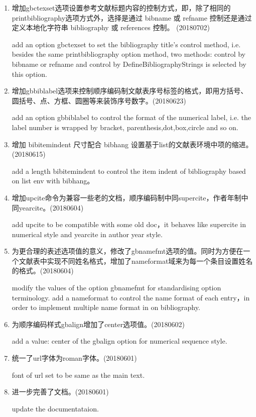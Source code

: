 

\label{up:180601}
\begin{enumerate}

\item 增加gbctexset选项设置参考文献标题内容的控制方式，即，除了相同的printbibliography选项方式外，选择是通过 bibname 或 refname 控制还是通过定义本地化字符串 bibliography 或 references 控制。 (20180702)

add an option gbctexset to set the bibliography title's control method, i.e. besides the same printbibliography option method, two methods: control by bibname or refname and control by DefineBibliographyStrings is selected by this option.

\item 增加gbbiblabel选项来控制顺序编码制文献表序号标签的格式，即用方括号、圆括号、点、方框、圆圈等来装饰序号数字。(20180623)

add an option gbbiblabel to control the format of the numerical label, i.e. the label number is wrapped by bracket, parenthesis,dot,box,circle and so on.

\item 增加 bibitemindent 尺寸配合 bibhang 设置基于list的文献表环境中项的缩进。(20180615)

add a length bibitemindent to control the item indent of bibliography based on list env with bibhang。

\item 增加upcite命令为兼容一些老的文档，顺序编码制中同supercite，作者年制中同yearcite。(20180604)

add upcite to be compatible with some old doc，it behaves like supercite in numerical style and yearcite in author year style.

\item 为更合理的表述选项值的意义，修改了gbnamefmt选项的值。同时为方便在一个文献表中实现不同姓名格式，增加了nameformat域来为每一个条目设置姓名的格式。(20180604)

modify the values of the option gbnamefmt for standardising option terminology. add a nameformat to control the name format of each entry，in order to implement multiple name format in on bibliography.

\item 为顺序编码样式gbalign增加了center选项值。(20180602)

add a value: center of the gbalign option for numerical sequence style.

\item 统一了url字体为roman字体。(20180601)

font of url set to be same as the main text.


\item 进一步完善了文档。(20180601)

update the documentataion.
\end{enumerate}


